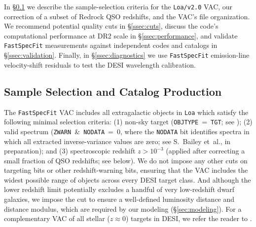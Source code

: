\documentclass[modern,linenumbers]{aastex701}
\newcommand{\fastspecfit}{\texttt{FastSpecFit}}
\begin{document}
In \S\ref{ssec:catalog} we describe the sample-selection criteria for
the \texttt{Loa/v2.0} VAC, our correction of a subset of Redrock QSO
redshifts, and the VAC's file organization. We recommend potential
quality cuts in \S\ref{ssec:cuts}, discuss the code's computational
performance at DR2 scale in \S\ref{ssec:performance}, and validate
\fastspecfit{} measurements against independent codes and catalogs in
\S\ref{ssec:validation}. Finally, in \S\ref{ssec:diagnostics} we use
\fastspecfit{} emission-line velocity-shift residuals to test the
DESI wavelength calibration.

\subsection{Sample Selection and Catalog Production}
\label{ssec:catalog}


The \fastspecfit{} VAC includes all extragalactic objects in
\texttt{Loa} which satisfy the following minimal selection criteria:
(1) non-sky target (\texttt{OBJTYPE}~=~\texttt{TGT}; see
\citealt{myers23a}); (2) valid spectrum
(\texttt{ZWARN}~\&~\texttt{NODATA}~=~0, where the \texttt{NODATA} bit
identifies spectra in which all extracted inverse-variance values are
zero; see S.~Bailey et~al., in preparation); and (3) spectroscopic
redshift $z > 10^{-3}$ (applied after correcting a small fraction of
QSO redshifts; see below). We do not impose any other cuts on
targeting bits or other redshift-warning bits, ensuring that the VAC
includes the widest possible range of objects across every DESI target
class. And although the lower redshift limit potentially excludes a
handful of very low-redshift dwarf galaxies, we impose the cut to
ensure a well-defined luminosity distance and distance modulus, which
are required by our modeling (\S\ref{sec:modeling}). For a
complementary VAC of all stellar ($z\approx0$) targets in DESI, we
refer the reader to \citet{koposov26a}.


\end{document}
